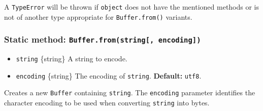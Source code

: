 \begin{Shaded}
\begin{Highlighting}[]
\NormalTok{ \{ }\NormalTok{ \} }\OperatorTok{=} \NormalTok{(}\NormalTok{)}\OperatorTok{;}

\NormalTok{  [}\NormalTok{]() \{}
     \OperatorTok{;}
\NormalTok{  \}}
\NormalTok{\}}

\OperatorTok{=} \NormalTok{(} \NormalTok{()}\OperatorTok{,} \NormalTok{)}\OperatorTok{;}
\end{Highlighting}
\end{Shaded}

A \texttt{TypeError} will be thrown if \texttt{object} does not have the
mentioned methods or is not of another type appropriate for
\texttt{Buffer.from()} variants.

\subsubsection{\texorpdfstring{Static method:
\texttt{Buffer.from(string{[},\ encoding{]})}}{Static method: Buffer.from(string{[}, encoding{]})}}\label{static-method-buffer.fromstring-encoding}

\begin{itemize}
\tightlist
\item
  \texttt{string} \{string\} A string to encode.
\item
  \texttt{encoding} \{string\} The encoding of \texttt{string}.
  \textbf{Default:} \texttt{\textquotesingle{}utf8\textquotesingle{}}.
\end{itemize}

Creates a new \texttt{Buffer} containing \texttt{string}. The
\texttt{encoding} parameter identifies the character encoding to be used
when converting \texttt{string} into bytes.

